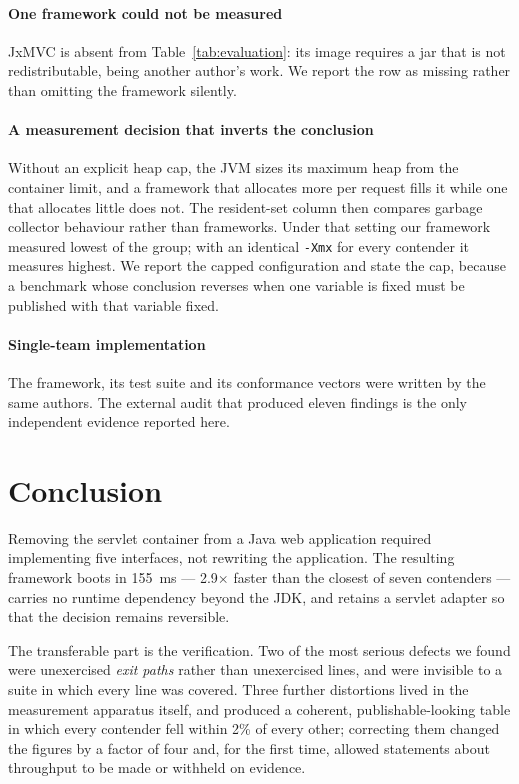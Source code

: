 \documentclass[preprint,12pt]{elsarticle}
\begin{document}
\paragraph{One framework could not be measured}
JxMVC is absent from Table~\ref{tab:evaluation}: its image requires a jar that
is not redistributable, being another author's work. We report the row as
missing rather than omitting the framework silently.

\paragraph{A measurement decision that inverts the conclusion}
Without an explicit heap cap, the JVM sizes its maximum heap from the container
limit, and a framework that allocates more per request fills it while one that
allocates little does not. The resident-set column then compares garbage
collector behaviour rather than frameworks. Under that setting our framework
measured lowest of the group; with an identical \texttt{-Xmx} for every
contender it measures highest. We report the capped configuration and state the
cap, because a benchmark whose conclusion reverses when one variable is fixed
must be published with that variable fixed.

\paragraph{Single-team implementation}
The framework, its test suite and its conformance vectors were written by the
same authors. The external audit that produced eleven findings is the only
independent evidence reported here.

\section{Conclusion}
\label{sec:conclusion}

Removing the servlet container from a Java web application required implementing
five interfaces, not rewriting the application. The resulting framework boots in
155~ms --- 2.9$\times$ faster than the closest of seven contenders --- carries no
runtime dependency beyond the JDK, and retains a servlet adapter so that the
decision remains reversible.

The transferable part is the verification. Two of the most serious defects we
found were unexercised \emph{exit paths} rather than unexercised lines, and were
invisible to a suite in which every line was covered. Three further distortions
lived in the measurement apparatus itself, and produced a coherent,
publishable-looking table in which every contender fell within 2\% of every
other; correcting them changed the figures by a factor of four and, for the
first time, allowed statements about throughput to be made or withheld on
evidence.
\end{document}

